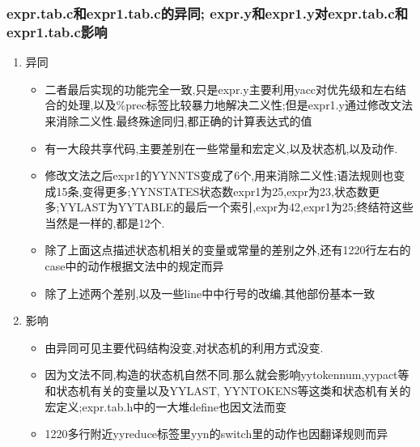 \documentclass[11pt]{article}
\begin{document}
\subsubsection{expr.tab.c和expr1.tab.c的异同; expr.y和expr1.y对expr.tab.c和expr1.tab.c影响}
\label{sec-1-1-3}
\begin{enumerate}
\item 异同
\label{sec-1-1-3-1}
\begin{itemize}
\item 二者最后实现的功能完全一致,只是expr.y主要利用yacc对优先级和左右结合的处理,以及\%prec标签比较暴力地解决二义性;但是expr1.y通过修改文法来消除二义性.最终殊途同归,都正确的计算表达式的值
\item 有一大段共享代码,主要差别在一些常量和宏定义,以及状态机,以及动作.
\item 修改文法之后expr1的YYNNTS变成了6个,用来消除二义性;语法规则也变成15条,变得更多;YYNSTATES状态数expr1为25,expr为23,状态数更多;YYLAST为YYTABLE的最后一个索引,expr为42,expr1为25;终结符这些当然是一样的,都是12个.
\item 除了上面这点描述状态机相关的变量或常量的差别之外,还有1220行左右的case中的动作根据文法中的规定而异
\item 除了上述两个差别,以及一些line中中行号的改编,其他部份基本一致
\end{itemize}
\item 影响
\label{sec-1-1-3-2}
\begin{itemize}
\item 由异同可见主要代码结构没变,对状态机的利用方式没变.
\item 因为文法不同,构造的状态机自然不同.那么就会影响yytokennum,yypact等和状态机有关的变量以及YYLAST, YYNTOKENS等这类和状态机有关的宏定义;expr.tab.h中的一大堆define也因文法而变
\item 1220多行附近yyreduce标签里yyn的switch里的动作也因翻译规则而异
\end{itemize}
\end{enumerate}
\end{document}
